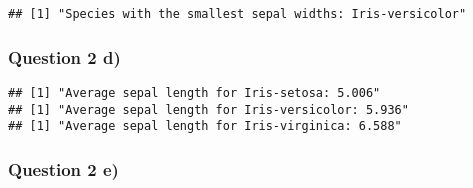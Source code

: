 \documentclass[
]{article}
\newenvironment{Shaded}{\begin{snugshade}}{\end{snugshade}}
\newcommand{\ControlFlowTok}[1]{\textcolor[rgb]{0.13,0.29,0.53}{\textbf{#1}}}
\newcommand{\DecValTok}[1]{\textcolor[rgb]{0.00,0.00,0.81}{#1}}
\newcommand{\FunctionTok}[1]{\textcolor[rgb]{0.00,0.00,0.00}{#1}}
\newcommand{\NormalTok}[1]{#1}
\newcommand{\SpecialCharTok}[1]{\textcolor[rgb]{0.00,0.00,0.00}{#1}}
\newcommand{\StringTok}[1]{\textcolor[rgb]{0.31,0.60,0.02}{#1}}
\begin{document}
\begin{Shaded}
\end{Shaded}

\begin{verbatim}
## [1] "Species with the smallest sepal widths: Iris-versicolor"
\end{verbatim}

\newpage

\hypertarget{question-2-d}{%
\subsubsection{Question 2 d)}\label{question-2-d}}

\begin{Shaded}
\end{Shaded}

\begin{verbatim}
## [1] "Average sepal length for Iris-setosa: 5.006"
## [1] "Average sepal length for Iris-versicolor: 5.936"
## [1] "Average sepal length for Iris-virginica: 6.588"
\end{verbatim}

\newpage

\hypertarget{question-2-e}{%
\subsubsection{Question 2 e)}\label{question-2-e}}
\end{document}
